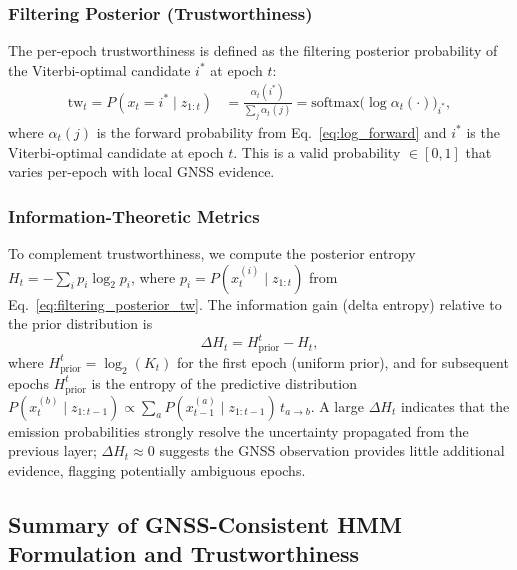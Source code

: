 \documentclass[letterpaper,journal]{IEEEtran}
\begin{document}
\subsubsection{Filtering Posterior (Trustworthiness)}

The per-epoch trustworthiness is defined as the filtering posterior
probability of the Viterbi-optimal candidate $i^*$ at epoch $t$:
\begin{equation}
\begin{aligned}
\text{tw}_t = P(x_t = i^* \mid z_{1:t})
&= \frac{\alpha_t(i^*)}{\sum_j \alpha_t(j)}
= \text{softmax}\big(\log \alpha_t(\cdot)\big)_{i^*},
\label{eq:filtering_posterior_tw}
\end{aligned}
\end{equation}
where $\alpha_t(j)$ is the forward probability from
Eq.~\eqref{eq:log_forward} and $i^*$ is the Viterbi-optimal
candidate at epoch $t$.  This is a valid probability $\in [0,1]$
that varies per-epoch with local GNSS evidence.

\subsubsection{Information-Theoretic Metrics}

To complement trustworthiness, we compute the posterior entropy
$H_t = -\sum_i p_i \log_2 p_i$, where
$p_i = P(x_t^{(i)} \mid z_{1:t})$ from Eq.~\eqref{eq:filtering_posterior_tw}.
The information gain (delta entropy) relative to the prior distribution is
\begin{equation}
\Delta H_t = H_{\text{prior}}^{t} - H_t,
\label{eq:delta_entropy}
\end{equation}
where $H_{\text{prior}}^{t} = \log_2(K_t)$ for the first epoch
(uniform prior), and for subsequent epochs $H_{\text{prior}}^{t}$ is the
entropy of the predictive distribution
$P(x_t^{(b)} \mid z_{1:t-1})
 \propto \sum_a P(x_{t-1}^{(a)} \mid z_{1:t-1}) \, t_{a \to b}$.
A large $\Delta H_t$ indicates that the emission probabilities
strongly resolve the uncertainty propagated from the previous layer;
$\Delta H_t \approx 0$ suggests the GNSS observation provides little
additional evidence, flagging potentially ambiguous epochs.


\subsection{Summary of GNSS-Consistent HMM Formulation and Trustworthiness}
\end{document}
